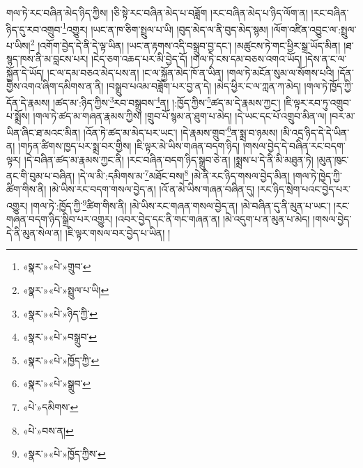 གལ་ཏེ་རང་བཞིན་མེད་ཉིད་ཀྱིས། །ཅི་སྟེ་རང་བཞིན་མེད་པ་བཟློག །རང་བཞིན་མེད་པ་ཉིད་ལོག་ན། །རང་བཞིན་ཉིད་དུ་རབ་འགྲུབ་\footnote{«སྣར་»«པེ་»གྲུབ་}འགྱུར། །ཡང་ན་ཁ་ཅིག་སྤྲུལ་པ་ཡི། །བུད་མེད་ལ་ནི་བུད་མེད་སྙམ། །ལོག་འཛིན་འབྱུང་ལ་:སྤྲུལ་པ་ཡིས།\footnote{«སྣར་»«པེ་»སྤྲུལ་པ་ཡི།} །འགོག་བྱེད་དེ་ནི་དེ་ལྟ་ཡིན། །ཡང་ན་རྟགས་འདི་བསྒྲུབ་བྱ་དང་། །མཚུངས་ཏེ་གང་ཕྱིར་སྒྲ་ཡོད་མིན། །ཐ་སྙད་ཁས་ནི་མ་བླངས་པར། །ངེད་ཅག་འཆད་པར་མི་བྱེད་དོ། །གལ་ཏེ་ངས་དམ་བཅས་འགའ་ཡོད། །དེས་ན་ང་ལ་སྐྱོན་དེ་ཡོད། །ང་ལ་དམ་བཅའ་མེད་པས་ན། །ང་ལ་སྐྱོན་མེད་ཁོ་ན་ཡིན། །གལ་ཏེ་མངོན་སུམ་ལ་སོགས་པའི། །དོན་གྱིས་འགའ་ཞིག་དམིགས་ན་ནི། །བསྒྲུབ་པའམ་བཟློག་པར་བྱ་ན་དེ། །མེད་ཕྱིར་ང་ལ་ཀླན་ཀ་མེད། །གལ་ཏེ་ཁྱོད་ཀྱི་དོན་དེ་རྣམས། །ཚད་མ་:ཉིད་ཀྱིས་\footnote{«སྣར་»«པེ་»ཉིད་ཀྱི་}རབ་བསྒྲུབས་\footnote{«སྣར་»«པེ་»བསྒྲུབ་}ན། །:ཁྱོད་ཀྱིས་\footnote{«སྣར་»«པེ་»ཁྱོད་ཀྱི་}ཚད་མ་དེ་རྣམས་ཀྱང་། །ཇི་ལྟར་རབ་ཏུ་འགྲུབ་པ་སྨྲོས། །གལ་ཏེ་ཚད་མ་གཞན་རྣམས་ཀྱིས། །གྲུབ་པོ་སྙམ་ན་ཐུག་པ་མེད། །དེ་ཡང་དང་པོ་འགྲུབ་མིན་ལ། །བར་མ་ཡིན་ཞིང་ཐ་མའང་མིན། །འོན་ཏེ་ཚད་མ་མེད་པར་ཡང་། །དེ་རྣམས་གྲུབ་\footnote{«སྣར་»«པེ་»སྒྲུབ་}ན་སྨྲ་བ་ཉམས། །མི་འདྲ་ཉིད་དེ་དེ་ཡིན་ན། །གཏན་ཚིགས་ཁྱད་པར་སྨྲ་བར་གྱིས། །ཇི་ལྟར་མེ་ཡིས་གཞན་བདག་ཉིད། །གསལ་བྱེད་དེ་བཞིན་རང་བདག་ལྟར། །དེ་བཞིན་ཚད་མ་རྣམས་ཀྱང་ནི། །རང་བཞིན་བདག་ཉིད་སྒྲུབ་ཅེ་ན། །སྨྲས་པ་དེ་ནི་མི་མཐུན་ཏེ། །མུན་ཁུང་ནང་གི་བུམ་པ་བཞིན། །དེ་ལ་མི་:དམིགས་མ་\footnote{«པེ་»དམིགས་}མཐོང་བས།\footnote{«པེ་»བས་ན།} །མེ་ནི་རང་ཉིད་གསལ་བྱེད་མིན། །གལ་ཏེ་ཁྱེད་ཀྱི་ཚིག་གིས་ནི། །མེ་ཡིས་རང་བདག་གསལ་བྱེད་ན། །འོ་ན་མེ་ཡིས་གཞན་བཞིན་དུ། །རང་ཉིད་སྲེག་པའང་བྱེད་པར་འགྱུར། །གལ་ཏེ་:ཁྱོད་ཀྱི་\footnote{«སྣར་»«པེ་»ཁྱོད་ཀྱིས་}ཚིག་གིས་ནི། །མེ་ཡིས་རང་གཞན་གསལ་བྱེད་ན། །མེ་བཞིན་དུ་ནི་མུན་པ་ཡང་། །རང་གཞན་བདག་ཉིད་སྒྲིབ་པར་འགྱུར། །འབར་བྱེད་དང་ནི་གང་གཞན་ན། །མེ་འདུག་པ་ན་མུན་པ་མེད། །གསལ་བྱེད་དེ་ནི་མུན་སེལ་ན། །ཇི་ལྟར་གསལ་བར་བྱེད་པ་ཡིན། །

